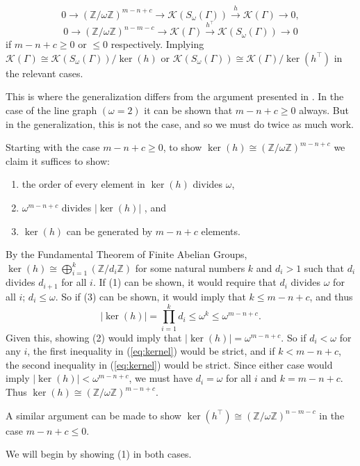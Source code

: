\documentclass[12pt]{report}
\theoremstyle{definition}
\def\ZZ{{\mathbb Z}}
\begin{document}
\[0\rightarrow (\ZZ/\omega\ZZ)^{m-n+c} \rightarrow \mathcal{K}(S_\omega(\Gamma)) \xrightarrow{h} \mathcal{K}(\Gamma) \rightarrow 0,\]
\[0\rightarrow (\ZZ/\omega\ZZ)^{n-m-c} \rightarrow \mathcal{K}(\Gamma) \xrightarrow{h^\top} \mathcal{K}(S_\omega(\Gamma)) \rightarrow 0\] 
if $m-n+c\geq0$ or $\leq0$ respectively. Implying $\mathcal{K}(\Gamma)\cong \mathcal{K}(S_\omega(\Gamma))/\ker(h)$ or $\mathcal{K}(S_\omega(\Gamma))\cong \mathcal{K}(\Gamma)/\ker(h^\top)$ in the relevant cases.\par
This is where the generalization differs from the argument presented in \cite{reiner}. In the case of the line graph $(\omega=2)$ it can be shown that $m-n+c\geq0$ always. But in the generalization, this is not the case, and so we must do twice as much work.\par
Starting with the case $m-n+c \geq 0$, to show $\ker(h) \cong (\ZZ/\omega\ZZ)^{m-n+c}$ we claim it suffices to show: 
\begin{enumerate}
    \item[(1)] the order of every element in $\ker(h)$ divides $\omega$,
    \item[(2)] $\omega^{m-n+c}$ divides $ |\ker(h)|$ , and
    \item[(3)] $\ker(h)$ can be generated by $m-n+c$ elements.
\end{enumerate}\par
By the Fundamental Theorem of Finite Abelian Groups, $\ker(h)\cong \bigoplus_{i=1}^k(\ZZ/d_i\ZZ)$ for some natural numbers $k$ and $d_i>1$ such that $d_i$ divides $d_{i+1}$ for all $i$. If (1) can be shown, it would require that $d_i$ divides $\omega$ for all $i$; $d_i\leq \omega$. So if (3) can be shown, it would imply that $k\leq m-n+c$, and thus \begin{equation}\label{eq:kernel} |\ker(h)|=\prod_{i=1}^k d_i \leq \omega^k \leq \omega^{m-n+c}.\end{equation} Given this, showing (2) would imply that $|\ker(h)|=\omega^{m-n+c}$. So if $d_i<\omega$ for any $i$, the first inequality in (\ref{eq:kernel}) would be strict, and if $k<m-n+c$, the second inequality in (\ref{eq:kernel}) would be strict. Since either case would imply $|\ker(h)|<\omega^{m-n+c}$, we must have $d_i=\omega$ for all $i $ and $k=m-n+c$. Thus $\ker(h)\cong(\ZZ/\omega\ZZ)^{m-n+c}$.\par
A similar argument can be made to show $\ker(h^\top) \cong (\ZZ/\omega\ZZ)^{n-m-c}$ in the case $m-n+c \leq 0$.\par
We will begin by showing (1) in both cases.
\end{document}
